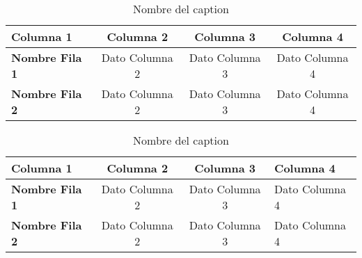 
\begin{table}[H]
	\centering
	\begin{tabular}{l c c c}
	\toprule
		\textbf{Columna 1}
		& \textbf{Columna 2}
		& \textbf{Columna 3}
		& \textbf{Columna 4}	\\
	\midrule
		\textbf{Nombre Fila 1}
            & Dato Columna 2
            & Dato Columna 3
            & Dato Columna 4	\\
		\textbf{Nombre Fila 2}
            & Dato Columna 2
            & Dato Columna 3
            & Dato Columna 4	\\
	\bottomrule
	\end{tabular}
	\caption{Nombre del caption}
	\label{cua:label_referencia}
\end{table}

\begin{table}[H]
	\centering
	\begin{tabular}{l c c p{5cm}}
	\toprule
		\textbf{Columna 1}
		& \textbf{Columna 2}
		& \textbf{Columna 3}
		& \textbf{Columna 4}	\\
	\midrule
		\textbf{Nombre Fila 1}
            & Dato Columna 2
            & Dato Columna 3
            & Dato Columna 4	\\
		\textbf{Nombre Fila 2}
            & Dato Columna 2
            & Dato Columna 3
            & Dato Columna 4	\\
	\bottomrule
	\end{tabular}
	\caption{Nombre del caption}
	\label{cua:label_referencia}
\end{table}
